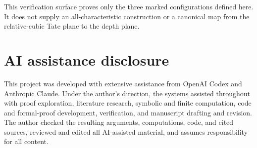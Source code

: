 \documentclass[11pt]{article}
\theoremstyle{definition}
\theoremstyle{remark}
\begin{document}
This verification surface proves only the three marked configurations
defined here.  It does not supply an all-characteristic construction or a
canonical map from the relative-cubic Tate plane to the depth plane.

\section*{AI assistance disclosure}

This project was developed with extensive assistance from OpenAI Codex and
Anthropic Claude. Under the author's direction, the systems assisted
throughout with proof exploration, literature research, symbolic and finite
computation, code and formal-proof development, verification, and manuscript
drafting and revision. The author checked the resulting arguments,
computations, code, and cited sources, reviewed and edited all AI-assisted
material, and assumes responsibility for all content.
\end{document}
